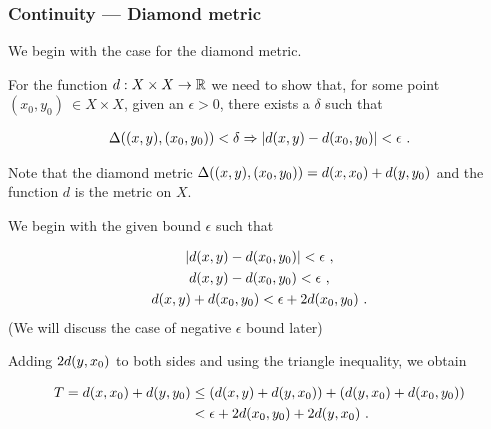 \begin{frame}
    \frametitle{Continuity --- Diamond metric}

    We begin with the case for the
    diamond metric.

    \pause

    For the function \(d: X\times X \to \mathbb{R}\) we need to show that, for some point \((x_0, y_0)\ \in X\times X \),
    given an \(\epsilon > 0\), there exists a \(\delta\) such that 

    \begin{gather}
        \Delta((x, y), (x_0, y_0)) < \delta \Rightarrow |d(x, y) - d(x_0, y_0)| < \epsilon~.
    \end{gather}

    Note that the diamond metric \(\Delta((x, y), (x_0, y_0)) = d(x, x_0) + d(y, y_0)\)
    and the function \(d\) is the metric on \(X\).

    
\end{frame}

\begin{frame}
    We begin with the given bound \(\epsilon\) such that

    \begin{gather}
        |d(x, y) - d(x_0, y_0)| < \epsilon~, \nonumber\\
        d(x, y) - d(x_0, y_0) < \epsilon~,  \nonumber\\
        d(x, y) +d(x_0, y_0)< \epsilon + 2d(x_0, y_0)~.
    \end{gather}
    (We will discuss the case of negative \(\epsilon\) bound later)
    \pause

    Adding \(2d(y, x_0)\) to both sides and using the triangle inequality,
    we obtain

    \begin{tcolorbox}[colframe=red, colback=red!10!white]
        \begin{align}
            T = d(x, x_0) + d(y, y_0) &\leq (d(x, y) + d(y, x_0)) + (d(y, x_0)+d(x_0, y_0)) \nonumber\\ 
            &< \epsilon + 2d(x_0, y_0) + 2d(y, x_0)~.
            \label{eqn:tresult}
        \end{align}
    \end{tcolorbox}

\end{frame}

